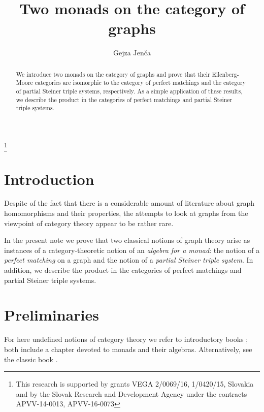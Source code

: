 \documentclass[reqno,A4paper]{amsart}
\theoremstyle{definition}
\numberwithin{equation}{section}
\begin{document}
\title{Two monads on the category of graphs}
\author{Gejza Jen\v ca}
\newcommand{\acr}{\newline\indent}
\address{\llap{*\,}
	Department of Mathematics and Descriptive Geometry\acr 
	Faculty of Civil Engineering\acr
	Radlinsk\' eho 11, 81368 Bratislava\acr 
	SLOVAKIA}
\thanks{
This research is supported by grants VEGA 2/0069/16, 1/0420/15,
Slovakia and by the Slovak Research and Development Agency under the contracts
APVV-14-0013, APVV-16-0073}
\begin{abstract}
We introduce two monads on the category of graphs and prove that their Eilenberg-Moore
categories are isomorphic to the category of perfect matchings and the category
of partial Steiner triple systems, respectively. 
As a simple application of these
results, we describe the product in the categories of perfect matchings
and partial Steiner triple systems.
\end{abstract}

\maketitle

\section{Introduction}

Despite of the fact that there is a considerable amount of literature about graph
homomorphisms and their properties, the attempts to look at graphs from
the viewpoint of category theory appear to be rather rare.  

In the present note we prove that two classical notions of graph theory arise
as instances of a category-theoretic notion of an {\em algebra for a monad}:
the notion of a {\em perfect matching} on a graph and the notion of a {\em
partial Steiner triple system}. In addition, we describe the product in the
categories of perfect matchings and partial Steiner triple systems.

\section{Preliminaries}

For here undefined notions of category theory we refer to introductory books
\cite{awodey2006category,riehl2016category}; both include a chapter devoted to
monads and their algebras. Alternatively, see the classic book \cite{mac1998categories}. 
\end{document}
